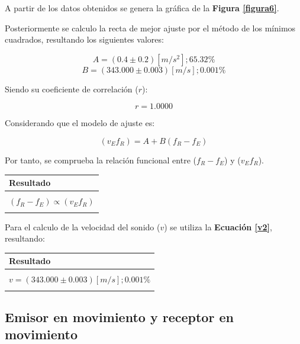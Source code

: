 \documentclass[letter,11pt]{article}
\begin{document}
A partir de los datos obtenidos se genera la gráfica de la
\textbf{Figura \ref{figura6}}.

Posteriormente se calculo la recta de mejor ajuste por el método de los mínimos
cuadrados, resultando los siguientes valores:

\begin{equation*}
    A = (0.4 \pm 0.2) [m/s^2]; 65.32\%
\end{equation*}
\begin{equation*}
    B = (343.000 \pm 0.003) [m/s]; 0.001\%
\end{equation*}
\vspace{0.10cm}

Siendo su coeficiente de correlación ($r$):

\begin{equation*}
    r = 1.0000
\end{equation*}
\vspace{0.10cm}

Considerando que el modelo de ajuste es:

\begin{equation*}
    (v_E f_R) = A + B (f_R - f_E)
\end{equation*}
\vspace{0.10cm}

Por tanto, se comprueba la relación funcional entre ($f_R - f_E$) y ($v_E f_R$).

\begin{center}
\begin{tabular}{|>{\centering}m{9.2cm}<{\centering}|}
\hline
\textbf{Resultado} 
\tabularnewline \hline
\\
$(f_R - f_E) \propto (v_E f_R)$ \tabularnewline
\\
\hline
\end{tabular}
\end{center}

Para el calculo de la velocidad del sonido ($v$) se utiliza la
\textbf{Ecuación \ref{v2}}, resultando:

\begin{center}
\begin{tabular}{|>{\centering}m{9.2cm}<{\centering}|}
\hline
\textbf{Resultado} 
\tabularnewline \hline
\\
$v = (343.000 \pm 0.003) [m/s]; 0.001\%$ \tabularnewline
\\
\hline
\end{tabular}
\end{center}

\subsection{Emisor en movimiento y receptor en movimiento}
\end{document}
